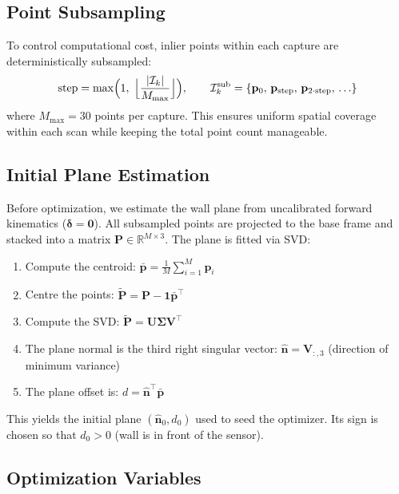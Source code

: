 \documentclass[12pt,a4paper]{article}
\newcommand{\R}{\mathbb{R}}
\newcommand{\nh}{\hat{\mathbf{n}}}
\newcommand{\pvec}{\mathbf{p}}
\begin{document}
\subsection{Point Subsampling}

To control computational cost, inlier points within each capture are
deterministically subsampled:
\begin{equation}
    \text{step} = \max\Bigl(1,\; \Bigl\lfloor \frac{|\mathcal{I}_k|}{M_{\max}} \Bigr\rfloor\Bigr),
    \qquad
    \mathcal{I}_k^{\text{sub}} = \{\pvec_{0},\, \pvec_{\text{step}},\, \pvec_{2\cdot\text{step}},\, \ldots\}
    \label{eq:subsample}
\end{equation}
where $M_{\max} = 30$ points per capture. This ensures uniform spatial
coverage within each scan while keeping the total point count manageable.

\subsection{Initial Plane Estimation}
\label{sec:init_plane}

Before optimization, we estimate the wall plane from uncalibrated
forward kinematics ($\bm{\delta} = \mathbf{0}$). All subsampled points are
projected to the base frame and stacked into a matrix $\mathbf{P} \in \R^{M \times 3}$.
The plane is fitted via SVD:
\begin{enumerate}[nosep]
    \item Compute the centroid: $\bar{\pvec} = \frac{1}{M}\sum_{i=1}^{M} \pvec_i$
    \item Centre the points: $\tilde{\mathbf{P}} = \mathbf{P} - \mathbf{1}\bar{\pvec}^\top$
    \item Compute the SVD: $\tilde{\mathbf{P}} = \mathbf{U}\bm{\Sigma}\mathbf{V}^\top$
    \item The plane normal is the third right singular vector:
          $\nh = \mathbf{V}_{:,3}$ (direction of minimum variance)
    \item The plane offset is: $d = \nh^\top \bar{\pvec}$
\end{enumerate}

This yields the initial plane $(\nh_0, d_0)$ used to seed the optimizer.
Its sign is chosen so that $d_0 > 0$ (wall is in front of the sensor).

\subsection{Optimization Variables}
\end{document}
